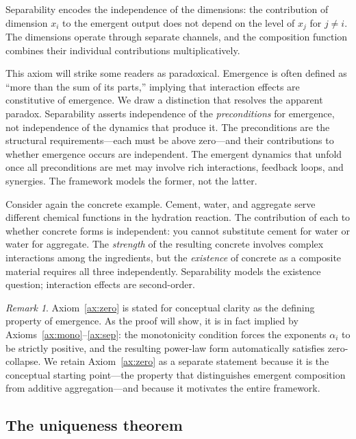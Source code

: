 \documentclass[12pt, a4paper]{article}
\theoremstyle{definition}
\theoremstyle{remark}
\newtheorem{remark}[theorem]{Remark}
\begin{document}
\noindent Separability encodes the independence of the dimensions: the contribution of dimension $x_i$ to the emergent output does not depend on the level of $x_j$ for $j \neq i$. The dimensions operate through separate channels, and the composition function combines their individual contributions multiplicatively.

This axiom will strike some readers as paradoxical. Emergence is often defined as ``more than the sum of its parts,'' implying that interaction effects are constitutive of emergence. We draw a distinction that resolves the apparent paradox. Separability asserts independence of the \textit{preconditions} for emergence, not independence of the dynamics that produce it. The preconditions are the structural requirements---each must be above zero---and their contributions to whether emergence occurs are independent. The emergent dynamics that unfold once all preconditions are met may involve rich interactions, feedback loops, and synergies. The framework models the former, not the latter.

Consider again the concrete example. Cement, water, and aggregate serve different chemical functions in the hydration reaction. The contribution of each to whether concrete forms is independent: you cannot substitute cement for water or water for aggregate. The \textit{strength} of the resulting concrete involves complex interactions among the ingredients, but the \textit{existence} of concrete as a composite material requires all three independently. Separability models the existence question; interaction effects are second-order.

\begin{remark}
Axiom~\ref{ax:zero} is stated for conceptual clarity as the defining property of emergence. As the proof will show, it is in fact implied by Axioms~\ref{ax:mono}--\ref{ax:sep}: the monotonicity condition forces the exponents $\alpha_i$ to be strictly positive, and the resulting power-law form automatically satisfies zero-collapse. We retain Axiom~\ref{ax:zero} as a separate statement because it is the conceptual starting point---the property that distinguishes emergent composition from additive aggregation---and because it motivates the entire framework.
\end{remark}

\subsection{The uniqueness theorem}
\end{document}
